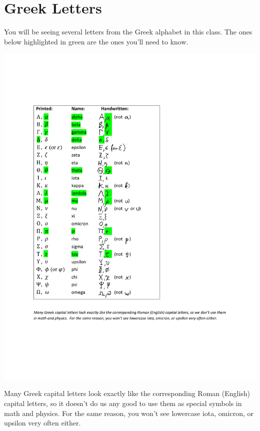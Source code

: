 \section{Greek Letters}

You will be seeing several letters from the Greek alphabet in this class.  The ones below highlighted in green are the ones you'll need to know.

\begin{center}
\includegraphics{appendices/greek_letter_table.pdf}
\end{center}

Many Greek capital letters look exactly like the corresponding Roman (English) capital letters, so it doesn't do us any good to use them as special symbols in math and physics.  For the same reason, you won't see lowercase iota, omicron, or upsilon very often either.

